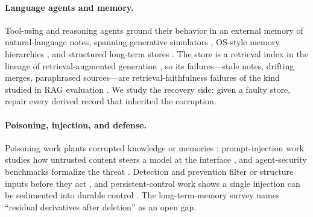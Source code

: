 \documentclass[11pt]{article}
\theoremstyle{remark}
\begin{document}
\paragraph{Language agents and memory.} Tool-using and reasoning agents
\citep{schick2023toolformer,yao2022react} ground their behavior in an
external memory of natural-language notes, spanning generative simulators
\citep{park2023generative}, OS-style memory hierarchies \citep{packer2023memgpt}, and
structured long-term stores \citep{zhong2024memorybank,modarressi2024memoryllm}. The store is
a retrieval index in the lineage of retrieval-augmented generation
\citep{lewis2020rag,karpukhin2020dpr,izacard2021fid,guu2020realm,borgeaud2022retro}, so its
failures---stale notes, drifting merges, paraphrased sources---are retrieval-faithfulness
failures of the kind studied in RAG evaluation \citep{gao2023ragsurvey,chen2023rgb,es2023ragas}.
We study the recovery side: given a faulty store, repair every derived record that inherited
the corruption.

\paragraph{Poisoning, injection, and defense.} Poisoning work plants corrupted knowledge or
memories \citep{chen2024agentpoison,zou2025poisonedrag,dong2025minja,huang2024memorysandbox,graftgraph2026};
prompt-injection work studies how untrusted content steers a model at the interface
\citep{greshake2023not,perez2022ignore,liu2023promptinjection}, and agent-security benchmarks
formalize the threat \citep{zhang2024asb,debenedetti2024agentdojo,toyer2024tensortrust}.
Detection and prevention filter or structure inputs before they act
\citep{liu2025datasentinel,chen2025struq}, and persistent-control work shows a single injection
can be sedimented into durable control \citep{yang2026zombie}. The long-term-memory survey
\citep{lin2026survey} names ``residual derivatives after deletion'' as an open gap.
\end{document}
